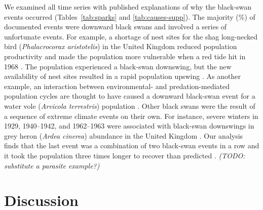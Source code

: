 We examined all time series with published explanations of why the black-swan
events occurred (Tables~\ref{tab:sparks} and \ref{tab:causes-supp}). The
majority (\percBSDown \%) of documented events were downward black swans and
involved a series of unfortunate events. For example, a shortage of nest sites
for the shag long-necked bird (\textit{Phalacrocorax aristotelis}) in the
United Kingdom reduced population productivity and made the population more
vulnerable when a red tide hit in 1968 \citep{potts1980}. The population
experienced a black-swan downswing, but the new availability of nest sites
resulted in a rapid population upswing \citep{potts1980}. As another example,
an interaction between environmental- and predation-mediated population cycles
are thought to have caused a downward black-swan event for a water vole
(\textit{Arvicola terrestris}) population \citep{saucy1994}. Other black swans
were the result of a sequence of extreme climate events on their own. For
instance, severe winters in 1929, 1940--1942, and 1962--1963 were associated
with black-swan downswings in grey heron (\textit{Ardea cinerea}) abundance in
the United Kingdom \citep{stafford1971}. Our analysis finds that the last event
was a combination of two black-swan events in a row and it took the population
three times longer to recover than predicted \citep{stafford1971}.
\textit{(TODO: substitute a parasite example?)}

\section{Discussion}

